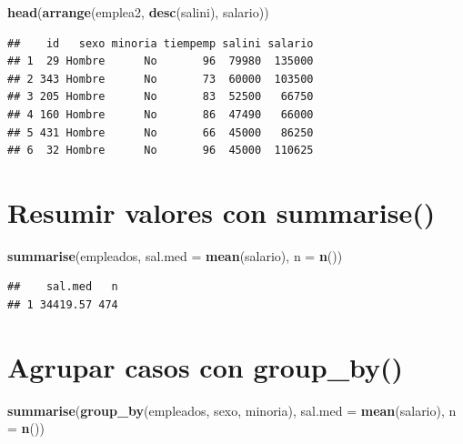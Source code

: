 \documentclass[]{book}
\newenvironment{Shaded}{\begin{snugshade}}{\end{snugshade}}
\newcommand{\KeywordTok}[1]{\textcolor[rgb]{0.13,0.29,0.53}{\textbf{#1}}}
\newcommand{\DataTypeTok}[1]{\textcolor[rgb]{0.13,0.29,0.53}{#1}}
\newcommand{\NormalTok}[1]{#1}
\begin{document}
\begin{Shaded}
\begin{Highlighting}[]
\KeywordTok{head}\NormalTok{(}\KeywordTok{arrange}\NormalTok{(emplea2, }\KeywordTok{desc}\NormalTok{(salini), salario))}
\end{Highlighting}
\end{Shaded}

\begin{verbatim}
##    id   sexo minoria tiempemp salini salario
## 1  29 Hombre      No       96  79980  135000
## 2 343 Hombre      No       73  60000  103500
## 3 205 Hombre      No       83  52500   66750
## 4 160 Hombre      No       86  47490   66000
## 5 431 Hombre      No       66  45000   86250
## 6  32 Hombre      No       96  45000  110625
\end{verbatim}

\section{\texorpdfstring{Resumir valores con
\textbf{summarise()}}{Resumir valores con summarise()}}\label{resumir-valores-con-summarise}

\begin{Shaded}
\begin{Highlighting}[]
\KeywordTok{summarise}\NormalTok{(empleados, }\DataTypeTok{sal.med =} \KeywordTok{mean}\NormalTok{(salario), }\DataTypeTok{n =} \KeywordTok{n}\NormalTok{())}
\end{Highlighting}
\end{Shaded}

\begin{verbatim}
##    sal.med   n
## 1 34419.57 474
\end{verbatim}

\section{\texorpdfstring{Agrupar casos con
\textbf{group\_by()}}{Agrupar casos con group\_by()}}\label{agrupar-casos-con-group_by}

\begin{Shaded}
\begin{Highlighting}[]
\KeywordTok{summarise}\NormalTok{(}\KeywordTok{group_by}\NormalTok{(empleados, sexo, minoria), }\DataTypeTok{sal.med =} \KeywordTok{mean}\NormalTok{(salario), }\DataTypeTok{n =} \KeywordTok{n}\NormalTok{())}
\end{Highlighting}
\end{Shaded}
\end{document}
